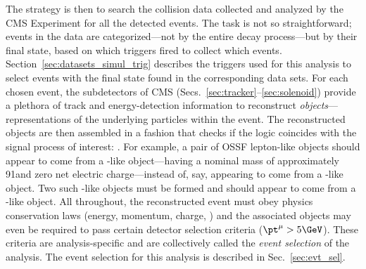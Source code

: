 The strategy is then to search the \pp collision data collected and analyzed by the CMS Experiment for all the detected \hzzfourl events.
The task is not so straightforward;
events in the data are categorized---not by the entire decay process---but by their final state, based on which triggers fired to collect which events.
Section~\ref{sec:datasets_simul_trig} describes the triggers used for this analysis to select events with the \fourl final state found in the corresponding data sets.
For each chosen event, the subdetectors of CMS (Secs.~\ref{sec:tracker}--\ref{sec:solenoid}) provide a plethora of track and energy-detection information to reconstruct \emph{objects}---representations of the underlying particles within the event.
The reconstructed objects are then assembled in a fashion that checks if the logic coincides with the signal process of interest: \hzzfourl.  %
For example, a pair of OSSF lepton-like objects should appear to come from a \PZ-like object---\ie having a nominal mass of approximately 91\GeV and zero net electric charge---instead of, say, appearing to come from a \PH-like object.
Two such \PZ-like objects must be formed and should appear to come from a \PH-like object.
All throughout, the reconstructed event must obey physics conservation laws (energy, momentum, charge, \etc) and the associated objects may even be required to pass certain detector selection criteria (\eg $\pt^\mu > 5\GeV$).
These criteria are analysis-specific and are collectively called the \emph{event selection} of the analysis.
The event selection for this analysis is described in Sec.~\ref{sec:evt_sel}.  %

